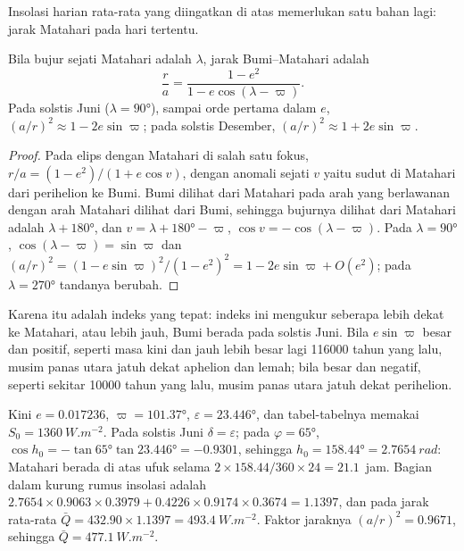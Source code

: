 Insolasi harian rata-rata yang diingatkan di atas memerlukan satu bahan lagi: jarak Matahari pada
hari tertentu.

\begin{proposition}\label{prop:b2:orbital-forcing:distance}
Bila bujur sejati Matahari adalah $\lambda$, jarak Bumi--Matahari adalah
\[
  \frac{r}{a} = \frac{1 - e^2}{1 - e\cos(\lambda - \varpi)} .
\]
Pada solstis Juni ($\lambda = \ang{90}$), sampai orde pertama dalam $e$,
$(a/r)^2 \approx 1 - 2e\sin\varpi$; pada solstis Desember, $(a/r)^2 \approx 1 + 2e\sin\varpi$.
\end{proposition}

\begin{proof}
Pada elips dengan Matahari di salah satu fokus, $r/a = (1 - e^2)/(1 + e\cos v)$, dengan anomali sejati $v$
yaitu sudut di Matahari dari perihelion ke Bumi. Bumi dilihat dari Matahari pada
arah yang berlawanan dengan arah Matahari dilihat dari Bumi, sehingga bujurnya dilihat dari Matahari adalah
$\lambda + \ang{180}$, dan $v = \lambda + \ang{180} - \varpi$, $\cos v = -\cos(\lambda - \varpi)$.
Pada $\lambda = \ang{90}$, $\cos(\lambda - \varpi) = \sin\varpi$ dan $(a/r)^2 = (1 -
e\sin\varpi)^2/(1 - e^2)^2 = 1 - 2e\sin\varpi + O(e^2)$; pada $\lambda = \ang{270}$ tandanya berubah.
\end{proof}

Karena itu  adalah indeks yang tepat: indeks ini mengukur seberapa lebih dekat ke Matahari, atau
lebih jauh, Bumi berada pada solstis Juni. Bila $e\sin\varpi$ besar dan positif, seperti masa kini dan
jauh lebih besar lagi \num{116000} tahun yang lalu, musim panas utara jatuh dekat aphelion dan lemah; bila
besar dan negatif, seperti sekitar \num{10000} tahun yang lalu, musim panas utara jatuh dekat perihelion.

\begin{example}\label{ex:b2:orbital-forcing:today}
Kini $e = 0.017236$, $\varpi = \ang{101.37}$, $\varepsilon = \ang{23.446}$, dan tabel-tabelnya memakai
$S_0 = \qty{1360}{W.m^{-2}}$. Pada solstis Juni $\delta = \varepsilon$; pada $\varphi =
\ang{65}$, $\cos h_0 = -\tan\ang{65}\tan\ang{23.446} = -0.9301$, sehingga $h_0 = \ang{158.44} =
\qty{2.7654}{rad}$: Matahari berada di atas ufuk selama $2 \times 158.44/360 \times 24 = 21.1$~jam. Bagian dalam kurung
rumus insolasi adalah $2.7654 \times 0.9063 \times 0.3979 + 0.4226 \times 0.9174 \times 0.3674 =
1.1397$, dan pada jarak rata-rata $\bar Q = 432.90 \times 1.1397 = \qty{493.4}{W.m^{-2}}$. Faktor
jaraknya $(a/r)^2 = 0.9671$, sehingga $\bar Q = \qty{477.1}{W.m^{-2}}$.
\end{example}

